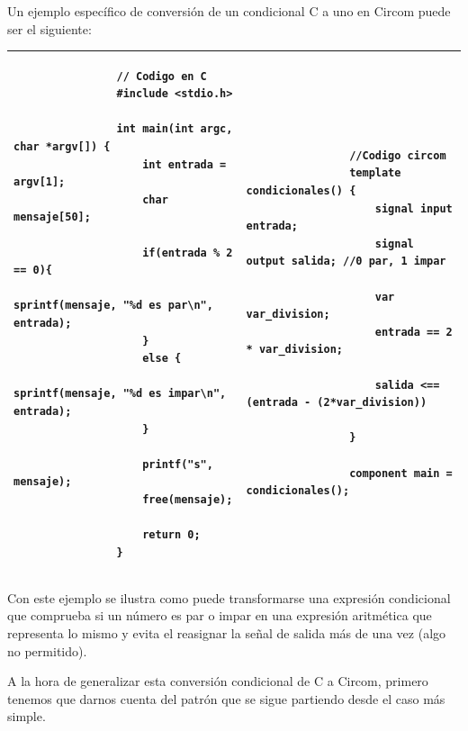 \documentclass[a4paper,10pt]{article}
\begin{document}
		\vspace{0.3cm}
		
		\noindent Un ejemplo específico de conversión de un condicional C a uno en Circom puede ser el siguiente: 
		
		\vspace{0.3cm}
		
		\begin{tabular}{p{} | p{}}
			\hline
			\lstset{language=C}
			\begin{lstlisting}
				// Codigo en C
				#include <stdio.h>
				
				int main(int argc, char *argv[]) {
					int entrada = argv[1];
					char mensaje[50];
					
					if(entrada % 2 == 0){ 
						sprintf(mensaje, "%d es par\n", entrada);
					}
					else {
						sprintf(mensaje, "%d es impar\n", entrada);
					}
					
					printf("s", mensaje);
					free(mensaje);
					
					return 0;
				}
			\end{lstlisting} 
			
			&
			
			\begin{lstlisting}[language=Circom]
				
				//Codigo circom
				template condicionales() {
					signal input entrada;
					signal output salida; //0 par, 1 impar
					
					var var_division;
					entrada == 2 * var_division;
					
					salida <== (entrada - (2*var_division)) 
					
				}
				
				component main = condicionales();
			\end{lstlisting}
			 \\
			 \hline
		\end{tabular}
		
		\vspace{0.3cm}
		
		\noindent Con este ejemplo se ilustra como puede transformarse una expresión condicional que comprueba si un número es par o impar en una expresión aritmética que representa lo mismo y evita el reasignar la señal de salida más de una vez (algo no permitido).
		
		\noindent A la hora de generalizar esta conversión condicional de C a Circom, primero tenemos que darnos cuenta del patrón que se sigue partiendo desde el caso más simple.
		
\end{document}
